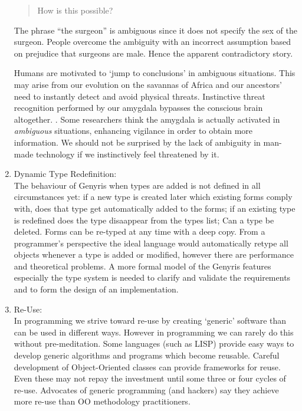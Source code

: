 \documentclass[a4paper,12pt,dvips]{article}
\begin{document}
\begin{enumerate}
\begin{quote}
How is this possible?
\end{quote}
The phrase ``the surgeon'' is ambiguous since it does not specify the sex of the surgeon. People overcome the ambiguity with an incorrect assumption based on prejudice that surgeons are male. Hence the apparent contradictory story.

Humans are motivated to `jump to conclusions' in ambiguous situations. This may arise from our  evolution on the savannas of Africa and our ancestors' need to instantly detect and avoid physical threats. Instinctive threat recognition performed by our amygdala bypasses the conscious brain altogether. \cite{winston}. Some researchers think the amygdala is actually activated in \textit{ambiguous} situations, enhancing vigilance in order to obtain more information. \cite{whalen} We should not be surprised by the lack of ambiguity in man-made technology if we instinctively feel threatened by it.

\item Dynamic Type Redefinition:\\
The behaviour of Genyris when types are added is not defined in all circumstances yet: if a new type is created later which existing forms comply with, does that type get automatically added to the forms;  if an existing type is redefined does the type disaappear from the types list; Can a type be deleted. Forms can be re-typed at any time with a deep copy. From a programmer's perspective the ideal language would automatically retype all objects whenever a type is added or modified, however there are performance and theoretical problems. A more formal model of the Genyris features especially the type system is needed to clarify and validate the requirements and to form the design of an implementation. 

\item Re-Use: \\
\label{reuse}In programming we strive toward re-use by creating `generic' software than can be used in different ways. However in programming we can rarely do this without pre-meditation. Some languages (such as LISP) provide easy ways to develop generic algorithms and programs which become reusable. Careful development of Object-Oriented classes can provide frameworks for reuse.  Even these may not repay the investment until some three or four cycles of re-use. \cite{reuse} Advocates of generic programming (and hackers) say they achieve more re-use than OO methodology practitioners.
  

\end{enumerate}
\end{document}

